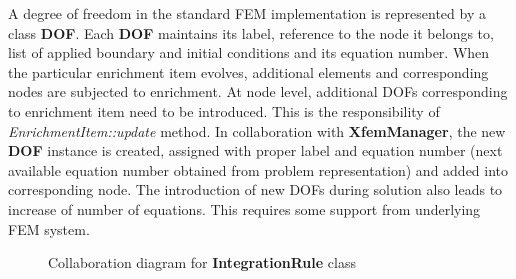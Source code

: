 \documentclass[a4paper]{article}
\newcommand{\class}[1]{{\bf #1}}
\newcommand{\service}[1]{{\em #1}}
\begin{document}
A degree of freedom in the standard FEM implementation is represented by a class \class{DOF}. Each \class{DOF} maintains its label, reference to the node it belongs to, list of applied boundary and initial conditions and its equation number. 
When the particular enrichment item evolves, additional elements and corresponding nodes are subjected to enrichment. At node level, additional DOFs corresponding to enrichment item need to be introduced. This is the responsibility of \service{EnrichmentItem::update} method. In collaboration with \class{XfemManager}, the new \class{DOF} instance is created, assigned with proper label and equation number (next available equation number obtained from problem representation) and added into corresponding node. The introduction of new DOFs during solution also leads to increase of number of equations. This requires some support from underlying FEM system.  


\begin{figure}[ht]
\begin{center}
\ifpdf
{}
\else
{}
\fi
\caption{Collaboration diagram for \class{IntegrationRule} class}
\label{fig:IntegrationRule}
\end{center}
\end{figure}
\end{document}
